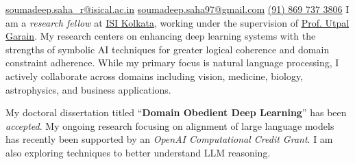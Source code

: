 \documentclass[10pt,a4paper]{article}
\begin{document}
\sloppy


\nobreakvspace{0.3em}
\noindent
\href{mailto:soumadeep.saha\_r@isical.ac.in}{\faEnvelope[regular] soumadeep.saha\_r@isical.ac.in}\sbull
\href{mailto:soumadeep.saha97@gmail.com}{\faEnvelope[regular] soumadeep.saha97@gmail.com}\sbull
\href{tel:+918697373806}{\faPhone (\textsmaller{+}91) 869 737 3806}\sbull
\href{https://github.com/espressovi}{\faGithub[regular]}\sbull
\href{https://www.linkedin.com/in/soumadeep-saha-a36a58103/}{\faLinkedin[regular]}\sbull
\href{https://espressovi.github.io}{\faLink}
\spacedhrule{0.6em}{-0.7em}
\vspace{-0.2em}
    I am a \emph{research fellow} at
    \href{https://www.isical.ac.in/}{ISI Kolkata}, working under the
    supervision of \href{https://www.isical.ac.in/~utpal}{Prof. Utpal Garain}.
    My research centers on enhancing deep learning systems with the strengths of
    symbolic AI techniques for greater logical coherence and domain constraint
    adherence. While my primary focus is natural language processing, I actively
    collaborate across domains including vision, medicine, biology,
    astrophysics, and business applications.   

    My doctoral dissertation titled ``\textbf{Domain Obedient Deep Learning}''
    has been \emph{accepted}. My ongoing research focusing on alignment of large
    language models has recently been supported by an \emph{OpenAI Computational
    Credit Grant}. I am also exploring techniques to better understand LLM
    reasoning.

\spacedhrule{1em}{-0.7em}

\end{document}
